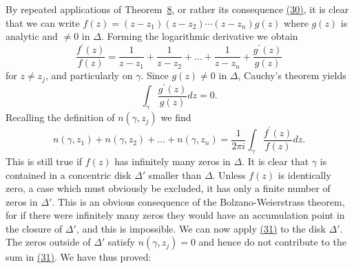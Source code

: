 By repeated applications of Theorem~\hyperref[thm:4.8]{8}, or rather its consequence \hyperref[eq:4.30]{(30)}, it is clear that we can write $f(z) = (z - z_1)(z - z_2) \cdots (z - z_n)g(z)$ where $g(z)$ is analytic and $\neq 0$ in $\Delta$. Forming the logarithmic derivative we obtain
\begin{equation*}
\frac {f ^ {\prime} (z)}{f (z)} = \frac {1}{z - z _ {1}} + \frac {1}{z - z _ {2}} + \dots + \frac {1}{z - z _ {n}} + \frac {g ^ {\prime} (z)}{g (z)}
\end{equation*}
for $z \neq z_{j}$, and particularly on $\gamma$. Since $g(z) \neq 0$ in $\Delta$, Cauchy's theorem yields
\begin{equation*}
\int_ {\gamma} \frac {g ^ {\prime} (z)}{g (z)} d z = 0.
\end{equation*}
Recalling the definition of $n(\gamma, z_j)$ we find
\begin{equation*}
n (\gamma , z _ {1}) + n (\gamma , z _ {2}) + \dots + n (\gamma , z _ {n}) = \frac {1}{2 \pi i} \int_ {\gamma} \frac {f ^ {\prime} (z)}{f (z)} d z.\tag{31}\label{eq:4.31}
\end{equation*}
This is still true if $f(z)$ has infinitely many zeros in $\Delta$. It is clear that $\gamma$ is contained in a concentric disk $\Delta'$ smaller than $\Delta$. Unless $f(z)$ is identically zero, a case which must obviously be excluded, it has only a finite number of zeros in $\Delta'$. This is an obvious consequence of the Bolzano-Weierstrass theorem, for if there were infinitely many zeros they would have an accumulation point in the closure of $\Delta'$, and this is impossible. We can now apply \hyperref[eq:4.31]{(31)} to the disk $\Delta'$. The zeros outside of $\Delta'$ satisfy $n(\gamma,z_{j})=0$ and hence do not contribute to the sum in \hyperref[eq:4.31]{(31)}. We have thus proved:


